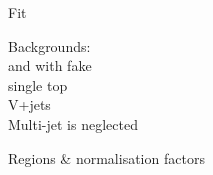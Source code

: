 Fit \mTW

Backgrounds:\\
\ttbar and \ttbar with fake \tauhad\\
single top \\
V+jets \\
Multi-jet is neglected

Regions \& normalisation factors



